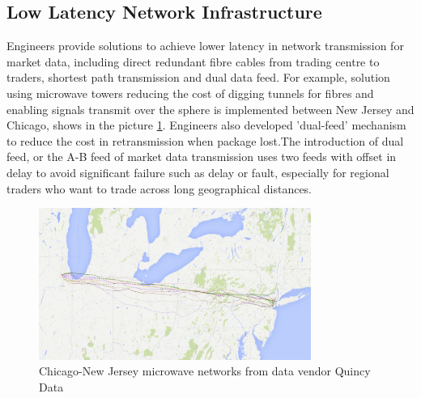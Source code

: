 \documentclass[11pt,openright,a4paper]{report}
\begin{document}
\subsection{Low Latency Network Infrastructure}
Engineers provide solutions to achieve lower latency in network transmission for market data, including direct redundant fibre cables from trading centre to traders, shortest path transmission and dual data feed. For example, solution using microwave towers reducing the cost of digging tunnels for fibres and enabling signals transmit over the sphere is implemented between New Jersey and Chicago\cite{htfbackyard}, shows in the picture \ref{fig:2}. Engineers also developed 'dual-feed' mechanism to reduce the cost in retransmission when package lost\cite{zusman1999fault}.The introduction of dual feed, or the A-B feed of market data transmission uses two feeds with offset in delay to avoid significant failure such as delay or fault, especially for regional traders who want to trade across long geographical distances. \\
\begin{figure}[htbp]
\centering\includegraphics[width=3.5in]{picture/newyork-chicago.jpg}
\caption{Chicago-New Jersey microwave networks from data vendor Quincy Data}
\label{fig:2}
\end{figure}
\end{document}
